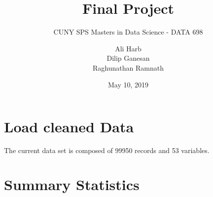 \documentclass[11pt,]{article}
\title{Final Project}
\subtitle{CUNY SPS Masters in Data Science - DATA 698}
\author{Ali Harb \\ Dilip Ganesan \\ Raghunathan Ramnath}
\date{May 10, 2019}
\begin{document}
\maketitle

{
\setcounter{tocdepth}{4}
\tableofcontents
}
\newpage

\section{Load cleaned Data}\label{load-cleaned-data}

The current data set is composed of 99950 records and 53 variables.

\newpage

\section{Summary Statistics}\label{summary-statistics}
\end{document}
